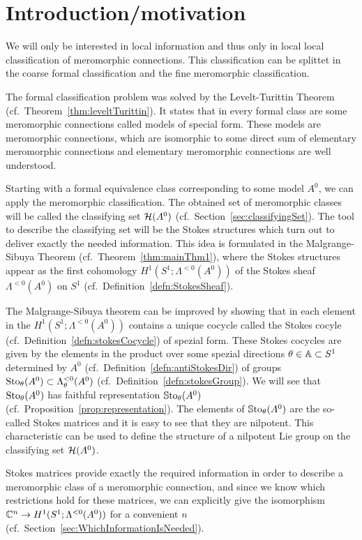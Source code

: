 \chapter{Introduction/motivation}

We will only be interested in local information and thus only in local local
classification of meromorphic connections.
This classification can be splittet in the coarse formal classification and the
fine meromorphic classification.

The formal classification problem was solved by the Levelt-Turittin Theorem
(cf.\ Theorem~\ref{thm:leveltTurittin}). It states that in every formal
class are some meromorphic connections called models of special form.
These models are meromorphic connections, which are isomorphic to some direct
sum of elementary meromorphic connections and elementary meromorphic
connections are well understood.

Starting with a formal equivalence class corresponding to some model $A^0$, we
can apply the meromorphic classification.
The obtained set of meromorphic classes will be called the classifying set
$\mathcal{H}(A^0)$ (cf.\ Section~\ref{sec:classifyingSet}).
The tool to describe the classifying set will be the Stokes structures which
turn out to deliver exactly the needed information.
This idea is formulated in the Malgrange-Sibuya Theorem
(cf.\ Theorem~\ref{thm:mainThm1}), where the Stokes structures appear as the
first cohomology $H^1(S^1;\Lambda^{<0}(A^0))$ of the Stokes sheaf
$\Lambda^{<0}(A^0)$ on $S^1$ (cf.\ Definition~\ref{defn:StokesSheaf}).

The Malgrange-Sibuya theorem can be improved by showing that in each element
in the $H^1(S^1;\Lambda^{<0}(A^0))$ contains a unique cocycle called the Stokes
cocyle (cf.\ Definition~\ref{defn:stokesCocycle}) of spezial form.
These Stokes cocycles are given by the elements in the product over some
spezial directions $\theta\in\mathbb{A}\subset S^1$ determined by $A^0$
(cf.\ Definition~\ref{defn:antiStokesDir}) of groups
$\operatorname{Sto}_\theta(A^0)\subset\Lambda_\theta^{<0}(A^0)$
(cf.\ Definition~\ref{defn:stokesGroup}).
We will see that $\operatorname{Sto}_\theta(A^0)$ has faithful representation
$\operatorname{\mathbb{S}to}_\theta(A^0)$ (cf.\ Proposition~\ref{prop:representation}).
The elements of $\operatorname{\mathbb{S}to}_\theta(A^0)$ are the so-called Stokes matrices and it is
easy to see that they are nilpotent.
This characteristic can be used to define the structure of a nilpotent Lie
group on the classifying set $\mathcal{H}(A^0)$.

Stokes matrices provide exactly the required information in order to describe a
meromorphic class of a meromorphic connection, and since we know which
restrictions hold for these matrices, we can explicitly give the isomorphism
$\mathbb{C}^n\to H^1(S^1;\Lambda^{<0}(A^0))$ for a convenient $n$
(cf.\ Section~\ref{sec:WhichInformationIsNeeded}).

\begin{comment}
  \begin{enumerate}
    \item first introduce asymptotic analysis
    \item then define languages for meromorphic connections or systems
    \item talk about Stokes structures
    \item more?
  \end{enumerate}
\end{comment}

